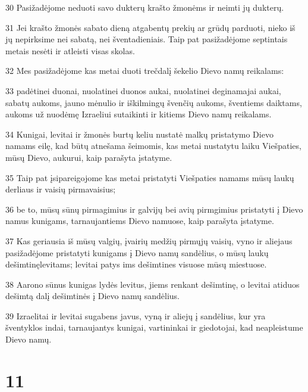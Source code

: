 \par 30 Pasižadėjome neduoti savo dukterų krašto žmonėms ir neimti jų dukterų. 
\par 31 Jei krašto žmonės sabato dieną atgabentų prekių ar grūdų parduoti, nieko iš jų nepirksime nei sabatą, nei šventadieniais. Taip pat pasižadėjome septintais metais nesėti ir atleisti visas skolas. 
\par 32 Mes pasižadėjome kas metai duoti trečdalį šekelio Dievo namų reikalams: 
\par 33 padėtinei duonai, nuolatinei duonos aukai, nuolatinei deginamajai aukai, sabatų aukoms, jauno mėnulio ir iškilmingų švenčių aukoms, šventiems daiktams, aukoms už nuodėmę Izraeliui sutaikinti ir kitiems Dievo namų reikalams. 
\par 34 Kunigai, levitai ir žmonės burtų keliu nustatė malkų pristatymo Dievo namams eilę, kad būtų atnešama šeimomis, kas metai nustatytu laiku Viešpaties, mūsų Dievo, aukurui, kaip parašyta įstatyme. 
\par 35 Taip pat įsipareigojome kas metai pristatyti Viešpaties namams mūsų laukų derliaus ir vaisių pirmavaisius; 
\par 36 be to, mūsų sūnų pirmagimius ir galvijų bei avių pirmgimius pristatyti į Dievo namus kunigams, tarnaujantiems Dievo namuose, kaip parašyta įstatyme. 
\par 37 Kas geriausia iš mūsų valgių, įvairių medžių pirmųjų vaisių, vyno ir aliejaus pasižadėjome pristatyti kunigams į Dievo namų sandėlius, o mūsų laukų dešimtinę­levitams; levitai patys ims dešimtines visuose mūsų miestuose. 
\par 38 Aarono sūnus kunigas lydės levitus, jiems renkant dešimtinę, o levitai atiduos dešimtą dalį dešimtinės į Dievo namų sandėlius. 
\par 39 Izraelitai ir levitai sugabens javus, vyną ir aliejų į sandėlius, kur yra šventyklos indai, tarnaujantys kunigai, vartininkai ir giedotojai, kad neapleistume Dievo namų.



\chapter{11}


